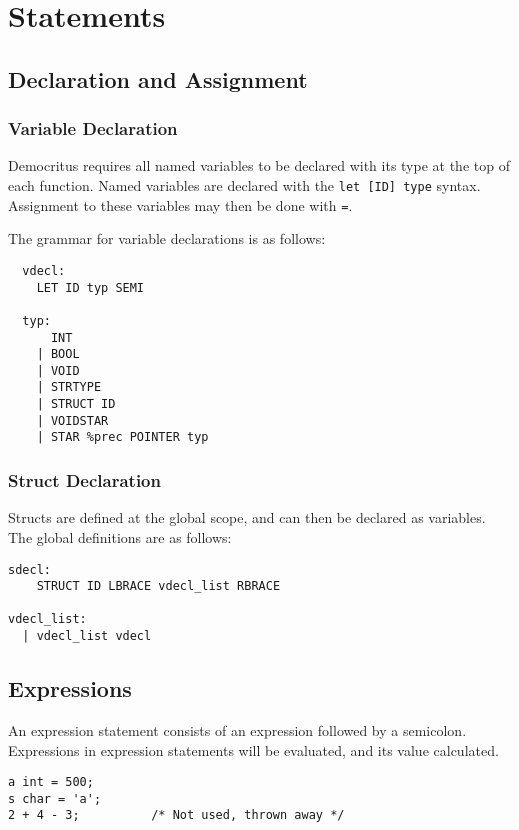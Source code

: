 \section{Statements}
    \subsection{Declaration and Assignment}


      \subsubsection{Variable Declaration}
        Democritus requires all named variables to be declared with its type at the top of each function. Named variables are declared with the \texttt{let [ID] type} syntax. Assignment to these variables may then be done with \texttt{=}.
        
        \bigskip \noindent 
        The grammar for variable declarations is as follows: 
        \begin{verbatim}
  vdecl:
    LET ID typ SEMI 

  typ:
      INT       
    | BOOL      
    | VOID      
    | STRTYPE   
    | STRUCT ID 
    | VOIDSTAR  
    | STAR %prec POINTER typ 
        \end{verbatim}

    \subsubsection{Struct Declaration}
      Structs are defined at the global scope, and can then be declared as variables. The global definitions are as follows: 

      \begin{verbatim}
sdecl:
    STRUCT ID LBRACE vdecl_list RBRACE

vdecl_list:
  | vdecl_list vdecl
      \end{verbatim}


    \subsection{Expressions}
        An expression statement consists of an expression followed by a semicolon. Expressions in expression statements will be evaluated, and its value calculated.

        \begin{lstlisting}
a int = 500;
s char = 'a';
2 + 4 - 3;          /* Not used, thrown away */
        \end{lstlisting}


